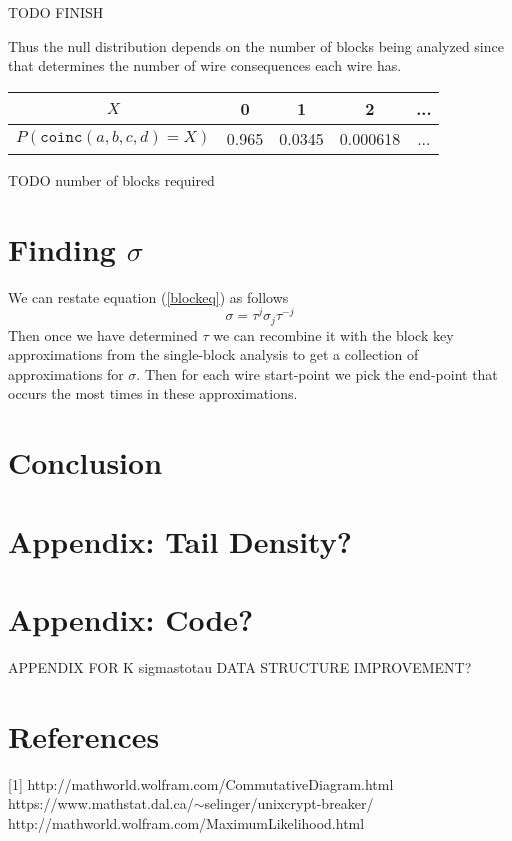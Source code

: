 \documentclass[12pt]{article}
\theoremstyle{definition}
\theoremstyle{remark}
\theoremstyle{remark}
\begin{document}
TODO FINISH


Thus the null distribution depends on the number of blocks being analyzed since that determines the number of wire consequences each wire has.
\begin{center}
\begin{tabular}{|c|c|c|c|c|}
\hline
$X$ & 0 & 1 & 2 & ... \\
\hline 
$P(\texttt{coinc}(a,b,c,d)=X)$ & 0.965 & 0.0345 & 0.000618 & ... \\

\hline
\end{tabular}
\end{center}

\par

\par
TODO number of blocks required

\section{Finding $\sigma$}

\par
We can restate equation (\ref{blockeq}) as follows
\[ \sigma = \tau^j \sigma_j \tau^{-j} \]
Then once we have determined $\tau$ we can recombine it with the block key approximations from the single-block analysis to get a collection of approximations for $\sigma$. Then for each wire start-point we pick the end-point that occurs the most times in these approximations.

% 


\section{Conclusion}

\section{Appendix: Tail Density?}
\section{Appendix: Code?}
APPENDIX FOR K sigmastotau DATA STRUCTURE IMPROVEMENT?
\section{References}

[1] http://mathworld.wolfram.com/CommutativeDiagram.html \\ 

\noindent
[2] https://www.mathstat.dal.ca/$\sim$selinger/unixcrypt-breaker/ \\

\noindent
[3] http://mathworld.wolfram.com/MaximumLikelihood.html
\end{document}
